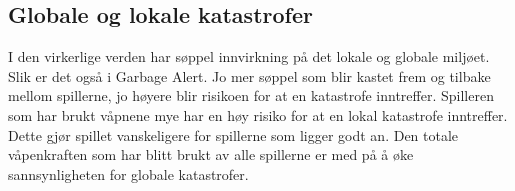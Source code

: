 

\subsection{Globale og lokale katastrofer}

I den virkerlige verden har søppel innvirkning på det lokale og globale miljøet. Slik er det også i Garbage Alert. Jo mer søppel som blir kastet frem og tilbake mellom spillerne, jo høyere blir risikoen for at en katastrofe inntreffer. Spilleren som har brukt våpnene mye har en høy risiko for at en lokal katastrofe inntreffer. Dette gjør spillet vanskeligere for spillerne som ligger godt an. Den totale våpenkraften som har blitt brukt av alle spillerne er med på å øke sannsynligheten for globale katastrofer.

